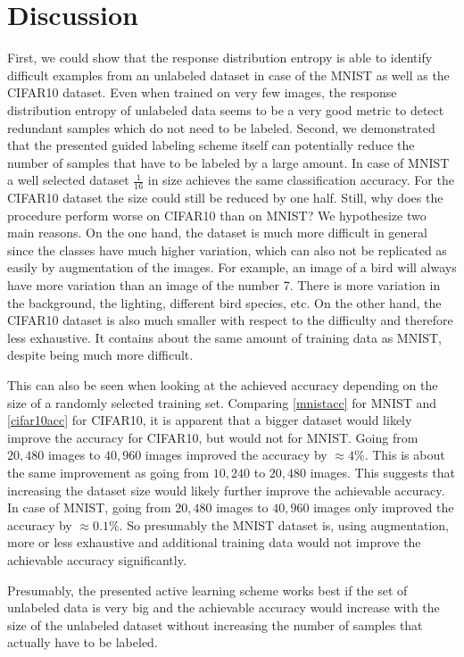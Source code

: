 \documentclass[10pt,twocolumn,letterpaper]{article}
\begin{document}
\section{Discussion}
\label{sec-5}
First, we could show that the response distribution entropy is able to
identify difficult examples from an unlabeled dataset in case of the
MNIST as well as the CIFAR10 dataset. Even when trained on very few
images, the response distribution entropy of unlabeled data seems to
be a very good metric to detect redundant samples which do not need to
be labeled. Second, we demonstrated that the presented guided labeling
scheme itself can potentially reduce the number of samples that have
to be labeled by a large amount. In case of MNIST a well selected
dataset $\frac{1}{16}$ in size achieves the same classification
accuracy. For the CIFAR10 dataset the size could still be reduced by
one half. Still, why does the procedure perform worse on CIFAR10 than
on MNIST? We hypothesize two main reasons. On the one hand, the
dataset is much more difficult in general since the classes have much
higher variation, which can also not be replicated as easily by
augmentation of the images. For example, an image of a bird will
always have more variation than an image of the number 7. There is
more variation in the background, the lighting, different bird
species, etc. On the other hand, the CIFAR10 dataset is also much
smaller with respect to the difficulty and therefore less exhaustive.
It contains about the same amount of training data as MNIST, despite
being much more difficult.

This can also be seen when looking at the achieved accuracy depending
on the size of a randomly selected training set. Comparing
\autoref{mnistacc} for MNIST and \autoref{cifar10acc} for CIFAR10, it
is apparent that a bigger dataset would likely improve the accuracy
for CIFAR10, but would not for MNIST. Going from $20,480$ images to
$40,960$ images improved the accuracy by $\approx4\%$. This is about the
same improvement as going from $10,240$ to $20,480$ images. This
suggests that increasing the dataset size would likely further improve
the achievable accuracy. In case of MNIST, going from $20,480$ images
to $40,960$ images only improved the accuracy by $\approx0.1\%$. So
presumably the MNIST dataset is, using augmentation, more or less
exhaustive and additional training data would not improve the
achievable accuracy significantly.

Presumably, the presented active learning scheme works best if the set
of unlabeled data is very big and the achievable accuracy would
increase with the size of the unlabeled dataset without increasing the
number of samples that actually have to be labeled.
\end{document}
